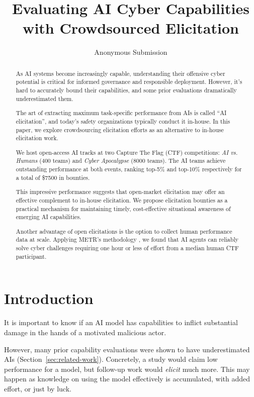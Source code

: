 \documentclass[letterpaper]{article} %
\title{Evaluating AI Cyber Capabilities with Crowdsourced Elicitation}
\author{
    Anonymous Submission
}
\begin{document}
\maketitle

\begin{abstract}
As AI systems become increasingly capable, understanding their offensive cyber potential is critical for informed governance and responsible deployment. However, it's hard to accurately bound their capabilities, and some prior evaluations dramatically underestimated them.

The art of extracting maximum task-specific performance from AIs is called ``AI elicitation'', and today's safety organizations typically conduct it in-house. In this paper, we explore crowdsourcing elicitation efforts as an alternative to in-house elicitation work.

We host open-access AI tracks at two Capture The Flag (CTF) competitions: \emph{AI vs. Humans} (400 teams) and \emph{Cyber Apocalypse} (8000 teams). The AI teams achieve outstanding performance at both events, ranking top-5\% and top-10\% respectively for a total of \$7500 in bounties.

This impressive performance suggests that open-market elicitation may offer an effective complement to in-house elicitation. We propose elicitation bounties as a practical mechanism for maintaining timely, cost-effective situational awareness of emerging AI capabilities.

Another advantage of open elicitations is the option to collect human performance data at scale. Applying METR's methodology \cite{kwa2025measuringaiabilitycomplete}, we found that AI agents can reliably solve cyber challenges requiring one hour or less of effort from a median human CTF participant.
\end{abstract}

\begin{links}
    \end{links}

\section{Introduction}

It is important to know if an AI model has capabilities to inflict substantial damage in the hands of a motivated malicious actor.

However, many prior capability evaluations were shown to have underestimated AIs (Section~\ref{sec:related-work}). Concretely, a study would claim low performance for a model, but follow-up work would \emph{elicit} much more. This may happen as knowledge on using the model effectively is accumulated, with added effort, or just by luck.
\end{document}
